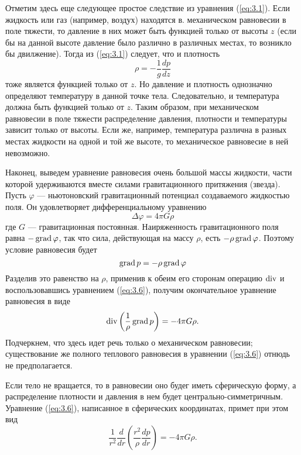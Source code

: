 Отметим здесь еще следующее простое следствие из уравнения (\ref{eq:3.1}). Если жидкость
или газ (например, воздух) находятся в. механическом равновесии в поле тяжести,
то давление в них может быть функцией только от высоты $z$ (если бы на данной
высоте давление было различно в различных местах, то возникло бы двилжение).
Тогда из (\ref{eq:3.1}) следует, что и плотность
\begin{equation}
   \label{eq:3.4}
   \rho = - \frac1{g} \frac{dp}{dz}
\end{equation}
тоже является функцией только от $z$. Но давление и плотность однозначно
определяют температуру в данной точке тела. Следовательно, и температура должна
быть функцией только от $z$. Таким образом, при механическом равновесии в поле
тяжести распределение давления, плотности и температуры зависит только от
высоты. Если же, например, температура различна в разных местах жидкости на
одной и той же высоте, то механическое равновесие в ней невозможно.

Наконец, выведем уравнение равновесия очень большой массы жидкости, части
которой удерживаются вместе силами гравитационного притяжения (звезда). Пусть
$\varphi$ — ньютоновский гравитационный потенциал создаваемого жидкостью поля.
Он удовлетворяет дифференциальному уравнению
\begin{equation}
   \label{eq:3.5}
   \Delta \varphi = 4 \pi G \rho
\end{equation}
где $G$ — гравитационная постоянная. Наиряженность гравитационного  поля   
равна $-\mathop{\mathrm{grad}}\nolimits \varphi$, так что сила, действующая на массу $\rho$, есть
$-\rho \mathop{\mathrm{grad}}\nolimits \varphi$. Поэтому условие равновесия будет
\[
   \mathop{\mathrm{grad}}\nolimits p = - \rho \mathop{\mathrm{grad}}\nolimits \varphi
\]
Разделив это равенство на $\rho$, применив к обеим его сторонам операцию $\mathop{\mathrm{div}}\nolimits$
и воспользовавшись уравнением (\ref{eq:3.6}), получим окончательное уравнение равновесия
в виде
\begin{equation}
   \label{eq:3.6}
   \mathop{\mathrm{div}}\nolimits \left( \frac1{\rho}\mathop{\mathrm{grad}}\nolimits p\right) = -4\pi G \rho.
\end{equation}
Подчеркнем, что здесь идет речь только о механическом равновесии; существование
же полного теплового равновесия в уравнении (\ref{eq:3.6}) отнюдь не предполагается.

Если тело не вращается, то в равновесии оно будег иметь сферическую форму, а
распределение плотности и давления в нем будет центрально-симметричным.
Уравнение (\ref{eq:3.6}), написанное в сферических координатах, примет при этом вид
\begin{equation}
   \label{eq:3.7}
   \frac1{r^2}\frac{d}{dr}\left(\frac{r^2}{\rho}\frac{dp}{dr}\right) = -4\pi G \rho.
\end{equation}
